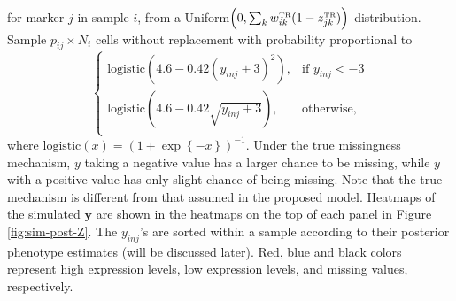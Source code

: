 \documentclass[12pt,]{article}
\newcommand{\p}[1]{\left(#1\right)}
\newcommand{\bc}[1]{ \left\{#1\right\} }
\def\beginmyfig{\begin{figure}[H]\center}
\def\endmyfig{\end{figure}}
\def\y{\bm{y}}
\newcommand{\true}{{\mbox{\tiny TR}}}
\def\beginmyfig{\begin{figure}[H]\center}
\def\endmyfig{\end{figure}}
\begin{document}
for marker $j$ in sample $i$, from a
Uniform$\p{0, \sum_k w^\true_{ik}(1-z^\true_{jk})}$ distribution. Sample
$p_{ij}\times N_i$ cells without replacement with probability proportional to
$$
\begin{cases}
  \text{logistic}\p{4.6 - 0.42(y_{inj}+3)^2}, & \text{if } y_{inj} < -3 \\
  \text{logistic}\p{4.6 - 0.42\sqrt{y_{inj}+3}}, & \text{otherwise,} \\
\end{cases}
$$
%
where $\text{logistic}(x) = (1 + \exp\bc{-x})^{-1}$.
Under the true missingness mechanism, $y$ taking a negative value has a larger
chance to be missing, while $y$ with a positive value has only slight chance of
being missing.  Note that the true mechanism is different from that assumed in
the proposed model. Heatmaps of the simulated $\y$ are shown in the heatmaps
on the top of each panel in Figure \ref{fig:sim-post-Z}.
The $y_{inj}$'s are sorted within a sample according to their posterior
phenotype estimates (will be discussed later). Red, blue and black colors
represent high expression levels, low expression levels, and missing values,
respectively.

\end{document}
